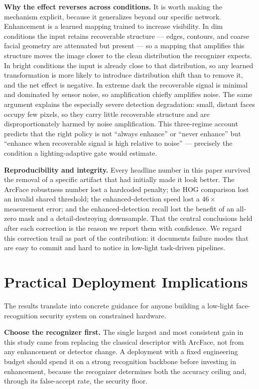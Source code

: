 \documentclass[conference]{IEEEtran}
\begin{document}
\textbf{Why the effect reverses across conditions.} It is worth
making the mechanism explicit, because it generalizes beyond our
specific network. Enhancement is a learned mapping trained to
increase visibility. In dim conditions the input retains
recoverable structure --- edges, contours, and coarse facial
geometry are attenuated but present --- so a mapping that
amplifies this structure moves the image closer to the clean
distribution the recognizer expects. In bright conditions the
input is already close to that distribution, so any learned
transformation is more likely to introduce distribution shift
than to remove it, and the net effect is negative. In extreme
dark the recoverable signal is minimal and dominated by sensor
noise, so amplification chiefly amplifies noise. The same
argument explains the especially severe detection degradation:
small, distant faces occupy few pixels, so they carry little
recoverable structure and are disproportionately harmed by
noise amplification. This three-regime account predicts that the
right policy is not ``always enhance'' or ``never enhance'' but
``enhance when recoverable signal is high relative to noise'' ---
precisely the condition a lighting-adaptive gate would estimate.

\textbf{Reproducibility and integrity.} Every headline number in
this paper survived the removal of a specific artifact that had
initially made it look better. The ArcFace robustness number lost
a hardcoded penalty; the HOG comparison lost an invalid shared
threshold; the enhanced-detection speed lost a $46\times$
measurement error; and the enhanced-detection recall lost the
benefit of an all-zero mask and a detail-destroying downsample.
That the central conclusions held after each correction is the
reason we report them with confidence. We regard this
correction trail as part of the contribution: it documents
failure modes that are easy to commit and hard to notice in
low-light task-driven pipelines.

\section{Practical Deployment Implications}
\label{sec:deployment}
The results translate into concrete guidance for anyone building
a low-light face-recognition security system on constrained
hardware.

\textbf{Choose the recognizer first.} The single largest and most
consistent gain in this study came from replacing the classical
descriptor with ArcFace, not from any enhancement or detector
change. A deployment with a fixed engineering budget should spend
it on a strong recognition backbone before investing in
enhancement, because the recognizer determines both the accuracy
ceiling and, through its false-accept rate, the security floor.
\end{document}
